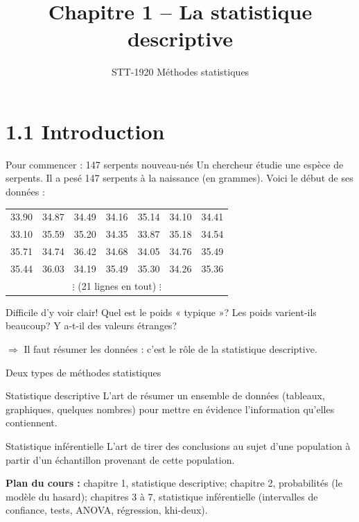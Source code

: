\documentclass{BeamerTemplate}
\title{Chapitre 1 -- La statistique descriptive}
\subtitle{STT-1920 Méthodes statistiques}
\date{}
\begin{document}
\begin{frame}[t]
  \titlepage
\end{frame}

\section[Introduction]{1.1 Introduction}

\begin{frame}[t]{Pour commencer : 147 serpents nouveau-nés}
  Un chercheur étudie une espèce de serpents. Il a pesé 147 serpents à la
  naissance (en grammes). Voici le début de ses données :

  \medskip
  \begin{center}\small
  \begin{tabular}{ccccccc}
    33.90 & 34.87 & 34.49 & 34.16 & 35.14 & 34.10 & 34.41\\
    33.10 & 35.59 & 35.20 & 34.35 & 33.87 & 35.18 & 34.54\\
    35.71 & 34.74 & 36.42 & 34.68 & 34.05 & 34.76 & 35.49\\
    35.44 & 36.03 & 34.19 & 35.49 & 35.30 & 34.26 & 35.36\\
    \multicolumn{7}{c}{$\vdots$ \quad (21 lignes en tout) \quad $\vdots$}
  \end{tabular}
  \end{center}

  \medskip

  Difficile d'y voir clair! Quel est le poids « typique »? Les poids
  varient-ils beaucoup? Y a-t-il des valeurs étranges?

  \medskip
  $\Rightarrow$ Il faut \alert{résumer} les données : c'est le rôle de la
  statistique descriptive.

\end{frame}

\begin{frame}[t]{Deux types de méthodes statistiques}
  \begin{Boite}{Statistique descriptive}
    L'art de \alert{résumer} un ensemble de données (tableaux, graphiques,
    quelques nombres) pour mettre en évidence l'information qu'elles
    contiennent.
  \end{Boite}


  \begin{Boite}{Statistique inférentielle}
    L'art de tirer des \alert{conclusions} au sujet d'une population à partir
    d'un échantillon provenant de cette population.
  \end{Boite}

  {\small
  \textbf{Plan du cours :} chapitre 1, statistique descriptive; chapitre 2,
  probabilités (le modèle du hasard); chapitres 3 à 7, statistique
  inférentielle (intervalles de confiance, tests, ANOVA, régression,
  khi-deux).\par}

\end{frame}
\end{document}
